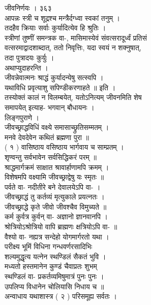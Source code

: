 \documentclass[11pt, openany]{book}
\begin{document}
{{{{{{{{{{{{{{{{{{{{{{{{{{{{{{{{{{{{{{{{{{{{{{{{{{{{{{{{{{{{{{{{{{{{{{{{{{{{{{{{{{{{{{{{{{{{{{{{{{{{{{{{{{{{{{{{{{{{{{{{{{{{{{{{{{{{{{{{{{{{{{{{{{{{{{{{ जीवनिर्णयः । ३६३\\
आपन्नः स्त्री च शूद्रश्च मन्त्रैर्दग्ध्वा स्वकां तनुम् ।\\
तदहैव क्रियाः सर्वाः कुर्यादित्येव हि श्रुतिः ।\\
स्त्रीणां तुष्णीं समन्त्रक वा-, मासिमास्येवं संवत्सरादूर्ध्वं प्रतिसं\\
वत्सरमाद्वादशाब्दात्, ततो निवृत्तिः, यदा स्वयं }{न}{ शक्नुषात्,\\
तदा पुत्रादयः कुर्युः ।\\
अथाप्युदाहरन्ति ।\\
जीवन्नेवात्मनः श्राद्धं कुर्यादन्येषु सत्स्वपि ।\\
यथाविधि प्रवृत्याशु सपिण्डीकरणाहते ॥ }{इति}{ ।\\
तस्योक्तं कालं }{न}{ विलम्बयेत्, यतोऽनित्यम् जीवनमिति शेष\\
समापयेत् इत्याह- भगवान् बौधायनः ।\\
}{लिङ्गपुराणे ।}{\\
जीवच्छ्राद्धविधिं वक्ष्ये समासाच्छ्रुतिसम्मतम् ।\\
मनवे देवदेवेन कथितं ब्रह्मणा पुरा ॥\\
( १ ) वासिष्ठाय वसिष्ठाय भार्गवाय च साम्प्रतम् ।\\
शृण्वन्तु सर्वभावेन सर्वसिद्धिकरं परम् ॥\\
श्राद्धमार्गक्रमं साक्षात श्रावार्हाणामपि क्रमम् ।\\
विशेषमपि वक्ष्यामि जीवच्छ्राद्वेषु यः स्मृतः ॥\\
पर्वते वा- नदीतीरे बने देवालयेऽपि वा- ।\\
जीवच्छ्राद्धं तु कर्तव्यं मृत्युकाले प्रयत्नतः ।\\
जीवच्छ्राद्धे कृते जीवो जीवश्चैव विमुच्यते ॥\\
कर्म कुर्वत्र कुर्वन् वा- अज्ञानो ज्ञानवानपि ।\\
श्रोत्रियोऽश्रोत्रियो वापि ब्राह्मणः क्षत्रियोऽपि वा- ॥\\
वैश्यो वा- नह्यत्र सन्देहो योगमार्गरतो यथा ।\\
परीक्ष्य भूमिं विधिना गन्धवर्णरसादिभिः \textbar{}\textbar{}\\
शल्यमुद्धृत्य यत्नेन स्थण्डिलं सैकतं भुवि ।\\
मध्यतो हस्तमानेन कुण्डं चैवाप्रतः शुभम् \textbar{}\textbar{}\\
स्थण्डिलं वा- प्रकर्तव्यमिषुमात्रं पुनः पुनः ।\\
उपलिप्य विधानेन चोलियासि निधाय च ॥\\
अन्वाधाय यथाशास्त्र ( २ ) परिसमूह्य सर्वतः ।\\


}}}}}}}}}}}}}}}}}}}}}}}}}}}}}}}}}}}}}}}}}}}}}}}}}}}}}}}}}}}}}}}}}}}}}}}}}}}}}}}}}}}}}}}}}}}}}}}}}}}}}}}}}}}}}}}}}}}}}}}}}}}}}}}}}}}}}}}}}}}}}}}}}}}}}}}}
\end{document}
